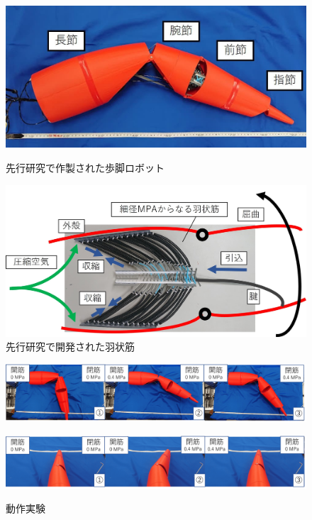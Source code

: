 \begin{figure}[t]
  \begin{minipage}{0.47\columnwidth}
    \centering
    \includegraphics[scale=0.2]{image/robot_scale.JPG}
    \vspace{3mm}
    \caption{先行研究で作製された歩脚ロボット\cite{hasegawa}}
    \label{fig:senkoukenkyuu}
  \end{minipage}
  \begin{minipage}{0.47\columnwidth}
    \centering
    \vspace{3mm}
    \includegraphics[scale=0.07]{image/mosiki.JPG}
    \caption{先行研究で開発された羽状筋\cite{hasegawa}}
    \label{fig:ujyoukin}
  \end{minipage}
\end{figure}
\begin{figure}[tbp]
  \begin{minipage}{1\hsize}
    \centering
    \includegraphics[scale=0.12]{image/move1all.png}
    \label{fig:move1}
  \end{minipage}
  \begin{minipage}{1\hsize}
    \centering
    \includegraphics[scale=0.12]{image/move2all.png}
    \label{fig:move2}
  \end{minipage}
%
  \caption{動作実験}
  \label{fig:movea12}
\end{figure}
